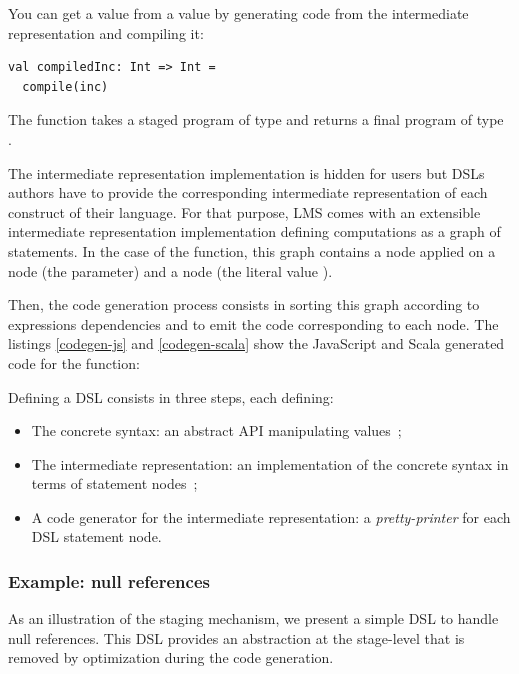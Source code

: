 \documentclass[runningheads,a4paper]{llncs}
\begin{document}
You can get a  value from a  value by generating code from the intermediate representation and
compiling it:
\begin{lstlisting}
val compiledInc: Int => Int =
  compile(inc)
\end{lstlisting}
The  function takes a staged program of type  and returns a final program of
type .

The intermediate representation implementation is hidden for users but DSLs authors have to provide the corresponding
intermediate representation of each construct of their language. For that purpose, LMS comes with an extensible
intermediate representation implementation defining computations as a graph of statements. In the case of the
 function, this graph contains a  node applied on a  node (the  parameter) and
a  node (the literal value ).

Then, the code generation process consists in sorting this graph according to expressions dependencies and to emit
the code corresponding to each node. The listings \ref{codegen-js} and \ref{codegen-scala} show the JavaScript and
Scala generated code for the  function:
\begin{multicols}{2}


\end{multicols}

Defining a DSL consists in three steps, each defining:

\begin{itemize}
\item The concrete syntax: an abstract API manipulating  values~;
\item The intermediate representation: an implementation of the concrete syntax in terms of statement nodes~;
\item A code generator for the intermediate representation: a \emph{pretty-printer} for each DSL statement node.
\end{itemize}

\subsubsection{Example: null references}

As an illustration of the staging mechanism, we present a simple DSL to handle null references. This DSL provides an
abstraction at the stage-level that is removed by optimization during the code generation.
\end{document}
